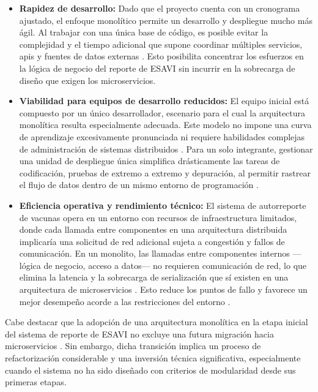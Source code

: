 \begin{itemize}

    \item \textbf{Rapidez de desarrollo:}  Dado que el proyecto cuenta con un cronograma ajustado, el enfoque monolítico permite un desarrollo y despliegue mucho más ágil. 
    Al trabajar con una única base de código, es posible evitar la complejidad y el tiempo adicional que supone coordinar múltiples servicios, \gls{api}s y fuentes de datos externas \cite{ibm_microservices_monolith}. 
    Esto posibilita concentrar los esfuerzos en la lógica de negocio del reporte de ESAVI sin incurrir en la sobrecarga de diseño que exigen los microservicios.

    \item \textbf{Viabilidad para equipos de desarrollo reducidos:} El equipo inicial está compuesto por un único desarrollador, escenario para el cual la arquitectura monolítica resulta especialmente adecuada. Este modelo no impone una curva de aprendizaje excesivamente pronunciada ni requiere habilidades complejas de administración de sistemas distribuidos \cite{ibm_microservices_monolith}. 
    Para un solo integrante, gestionar una unidad de despliegue única simplifica drásticamente las tareas de codificación, pruebas de extremo a extremo y depuración, al permitir rastrear el flujo de datos dentro de un mismo entorno de programación \cite{ibm_microservices_monolith}.

    \item \textbf{Eficiencia operativa y rendimiento técnico:} El sistema de autorreporte de vacunas opera en un entorno con recursos de infraestructura limitados, donde cada llamada entre componentes en una arquitectura distribuida implicaría una solicitud de red adicional sujeta a congestión y fallos de comunicación. 
    En un monolito, las llamadas entre componentes internos —lógica de negocio, acceso a datos— no requieren comunicación de red, lo que elimina la latencia y la sobrecarga de serialización que sí existen en una arquitectura de microservicios \cite{docker_microservices_need}. 
    Esto reduce los puntos de fallo y favorece un mejor desempeño acorde a las restricciones del entorno \cite{ibm_microservices_monolith}.
    
\end{itemize}

Cabe destacar que la adopción de una arquitectura monolítica en la etapa inicial del sistema de reporte de ESAVI no excluye una futura migración hacia microservicios \cite{aws_monolith_microservices}.
Sin embargo, dicha transición implica un proceso de refactorización considerable y una inversión técnica significativa, especialmente cuando el sistema no ha sido diseñado con criterios de modularidad desde sus primeras etapas.

